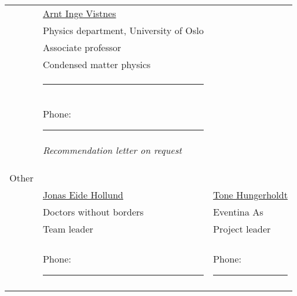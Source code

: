 \documentclass[letterpaper,9pt,oneside]{article}
\begin{document}
\begin{tabular}{@{} l l l}
	 
	&  \href{https://www.mn.uio.no/fysikk/personer/vit/arntvi/}{Arnt Inge Vistnes} & \href{}{} \\
	& Physics department, University of Oslo &   \\
	& Associate professor& \\
	& Condensed matter physics &  \\
	& \small{ \rule{3cm}{5pt}}& \\&\small{Phone: \rule{3cm}{5pt}}& \\
	&\textit{Recommendation letter on request}&\\
	&&\\ &&\\&&\\
	\Large{Other} & &\\&  \href{http://www.professorone.com}{Jonas Eide Hollund} & \href{http://www.professortwo.com}{Tone Hungerholdt} \\
	& Doctors without borders& Eventina As  \\
	& Team leader &  Project leader  \\
	&\small{\href{mailto:jonas.hollund@legerutengrenser.no}{ \rule{3cm}{5pt}}} & \small{\href{mailto:prof2@email.com}{ \rule{3cm}{5pt}}}\\
	&  \small{Phone:  \rule{3cm}{5pt}}& \small{Phone:  \rule{3cm}{5pt}} \\
	&& \\
\end{tabular}\\
\end{document}
